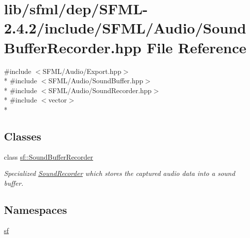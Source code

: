 \hypertarget{sfml_2dep_2_s_f_m_l-2_84_82_2include_2_s_f_m_l_2_audio_2_sound_buffer_recorder_8hpp}{\section{lib/sfml/dep/\-S\-F\-M\-L-\/2.4.2/include/\-S\-F\-M\-L/\-Audio/\-Sound\-Buffer\-Recorder.hpp File Reference}
\label{sfml_2dep_2_s_f_m_l-2_84_82_2include_2_s_f_m_l_2_audio_2_sound_buffer_recorder_8hpp}
}
{\ttfamily \#include $<$S\-F\-M\-L/\-Audio/\-Export.\-hpp$>$}\\*
{\ttfamily \#include $<$S\-F\-M\-L/\-Audio/\-Sound\-Buffer.\-hpp$>$}\\*
{\ttfamily \#include $<$S\-F\-M\-L/\-Audio/\-Sound\-Recorder.\-hpp$>$}\\*
{\ttfamily \#include $<$vector$>$}\\*
\subsection*{Classes}
\begin{DoxyCompactItemize}
\item 
class \hyperlink{classsf_1_1_sound_buffer_recorder}{sf\-::\-Sound\-Buffer\-Recorder}
\begin{DoxyCompactList}\small\item\em Specialized \hyperlink{classsf_1_1_sound_recorder}{Sound\-Recorder} which stores the captured audio data into a sound buffer. \end{DoxyCompactList}\end{DoxyCompactItemize}
\subsection*{Namespaces}
\begin{DoxyCompactItemize}
\item 
\hyperlink{namespacesf}{sf}
\end{DoxyCompactItemize}
